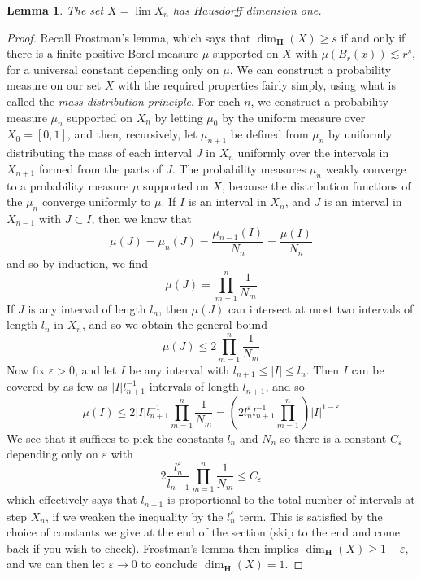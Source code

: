\documentclass{report}
\theoremstyle{plain}
\newtheorem{lemma}{Lemma}
\theoremstyle{plain}
\begin{document}
\begin{lemma}
    The set $X = \lim X_n$ has Hausdorff dimension one.
\end{lemma}
\begin{proof}
Recall Frostman's lemma, which says that $\dim_{\mathbf{H}}(X) \geq s$ if and only if there is a finite positive Borel measure $\mu$ supported on $X$ with $\mu(B_r(x)) \lesssim r^s$, for a universal constant depending only on $\mu$. We can construct a probability measure on our set $X$ with the required properties fairly simply, using what is called the {\it mass distribution principle}. For each $n$, we construct a probability measure $\mu_n$ supported on $X_n$ by letting $\mu_0$ by the uniform measure over $X_0 = [0,1]$, and then, recursively, let $\mu_{n+1}$ be defined from $\mu_n$ by uniformly distributing the mass of each interval $J$ in $X_n$ uniformly over the intervals in $X_{n+1}$ formed from the parts of $J$. The probability measures $\mu_n$ weakly converge to a probability measure $\mu$ supported on $X$, because the distribution functions of the $\mu_n$ converge uniformly to $\mu$. If $I$ is an interval in $X_n$, and $J$ is an interval in $X_{n-1}$ with $J \subset I$, then we know that
%
\[ \mu(J) = \mu_{n}(J) = \frac{\mu_{n-1}(I)}{N_n} = \frac{\mu(I)}{N_n} \]
%
and so by induction, we find
%
\[ \mu(J) = \prod_{m = 1}^n \frac{1}{N_m} \]
%
If $J$ is any interval of length $l_n$, then $\mu(J)$ can intersect at most two intervals of length $l_n$ in $X_n$, and so we obtain the general bound
%
\[ \mu(J) \leq 2 \prod_{m = 1}^n \frac{1}{N_m} \]
%
Now fix $\varepsilon > 0$, and let $I$ be any interval with $l_{n+1} \leq |I| \leq l_n$. Then $I$ can be covered by as few as $|I|l_{n+1}^{-1}$ intervals of length $l_{n+1}$, and so
%
\[ \mu(I) \leq 2|I|l_{n+1}^{-1} \prod_{m = 1}^n \frac{1}{N_m} = \left( 2l_n^\varepsilon l_{n+1}^{-1} \prod_{m = 1}^n \right) |I|^{1 - \varepsilon} \]
%
We see that it suffices to pick the constants $l_n$ and $N_n$ so there is a constant $C_\varepsilon$ depending only on $\varepsilon$ with
%
\[ 2 \frac{l_n^\varepsilon}{l_{n+1}} \prod_{m = 1}^n \frac{1}{N_m} \leq C_\varepsilon \]
%
which effectively says that $l_{n+1}$ is proportional to the total number of intervals at step $X_n$, if we weaken the inequality by the $l_n^\varepsilon$ term. This is satisfied by the choice of constants we give at the end of the section (skip to the end and come back if you wish to check). Frostman's lemma then implies $\dim_{\mathbf{H}}(X) \geq 1 - \varepsilon$, and we can then let $\varepsilon \to 0$ to conclude $\dim_{\mathbf{H}}(X) = 1$.
\end{proof}
\end{document}
